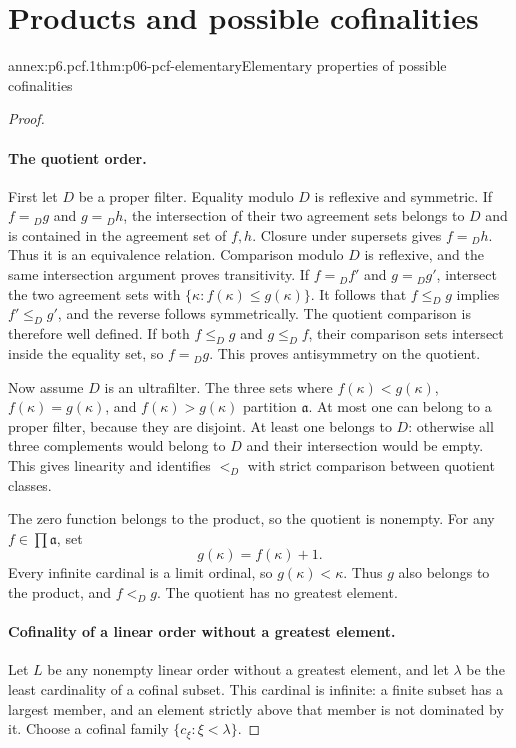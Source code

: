 
\section{Products and possible cofinalities}

\begin{annexitem}{annex:p6.pcf.1}{thm:p06-pcf-elementary}{Elementary properties of possible cofinalities}
\begin{proof}
\paragraph{The quotient order.}
First let \(D\) be a proper filter.
Equality modulo \(D\) is reflexive and symmetric.
If \(f={}_D g\) and \(g={}_D h\), the intersection of their two
agreement sets belongs to \(D\) and is contained in the agreement
set of \(f,h\).  Closure under supersets gives \(f={}_D h\).
Thus it is an equivalence relation.
Comparison modulo \(D\) is reflexive, and the same intersection
argument proves transitivity.
If \(f={}_D f'\) and \(g={}_D g'\), intersect the two agreement
sets with \(\{\kappa:f(\kappa)\leq g(\kappa)\}\).
It follows that \(f\leq_D g\) implies \(f'\leq_D g'\), and the
reverse follows symmetrically.
The quotient comparison is therefore well defined.
If both \(f\leq_D g\) and \(g\leq_D f\), their comparison sets
intersect inside the equality set, so \(f={}_D g\).
This proves antisymmetry on the quotient.

Now assume \(D\) is an ultrafilter.
The three sets where \(f(\kappa)<g(\kappa)\),
\(f(\kappa)=g(\kappa)\), and \(f(\kappa)>g(\kappa)\) partition
\(\mathfrak a\).
At most one can belong to a proper filter, because they are disjoint.
At least one belongs to \(D\): otherwise all three complements
would belong to \(D\) and their intersection would be empty.
This gives linearity and identifies \(<_D\) with strict comparison
between quotient classes.

The zero function belongs to the product, so the quotient is nonempty.
For any \(f\in\prod\mathfrak a\), set
\[
 g(\kappa)=f(\kappa)+1.
\]
Every infinite cardinal is a limit ordinal, so \(g(\kappa)<\kappa\).
Thus \(g\) also belongs to the product, and \(f<_D g\).
The quotient has no greatest element.

\paragraph{Cofinality of a linear order without a greatest element.}
Let \(L\) be any nonempty linear order without a greatest element,
and let \(\lambda\) be the least cardinality of a cofinal subset.
This cardinal is infinite: a finite subset has a largest member,
and an element strictly above that member is not dominated by it.
Choose a cofinal family \(\{c_\xi:\xi<\lambda\}\).


\end{proof}
\end{annexitem}
